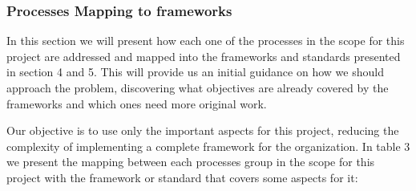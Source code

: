 \subsubsection{Processes Mapping to frameworks}

In this section we will present how each one of the processes in the scope for this project are addressed and mapped into the frameworks and standards presented in section 4 and 5. This will provide us an initial guidance on how we should approach the problem, discovering what objectives are already covered by the frameworks and which ones need more original work.\par
Our objective is to use only the important aspects for this project, reducing the complexity of implementing a complete framework for the organization. In table 3 we present the mapping between each processes group in the scope for this project with the framework or standard that covers some aspects for it:\par

